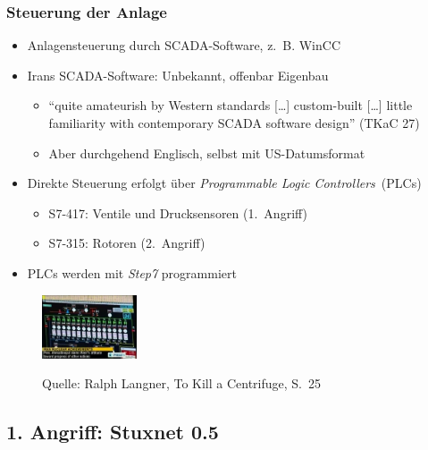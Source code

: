 \documentclass{beamer}
\begin{document}
\begin{frame}
  \frametitle{Steuerung der Anlage}
  \begin{itemize}
    \item Anlagensteuerung durch SCADA-Software, z.~B. WinCC
    \item Irans SCADA-Software: Unbekannt, offenbar Eigenbau
      \begin{itemize}
        \item ``quite amateurish by Western standards […] custom-built […] little familiarity with contemporary SCADA software design'' (TKaC 27)
        \item Aber durchgehend Englisch, selbst mit US-Datumsformat
      \end{itemize}
    \item Direkte Steuerung erfolgt über \emph{Programmable Logic Controllers}~(PLCs)
      \begin{itemize}
        \item S7-417: Ventile und Drucksensoren (1.~Angriff)
        \item S7-315: Rotoren (2.~Angriff)
      \end{itemize}
    \item PLCs werden mit \emph{Step7} programmiert
  \end{itemize}
  \begin{figure}
    \vspace{-0.2\textheight}
    \raggedleft
    \includegraphics[width=0.25\textwidth]{../SCADA.png}
    
    \tiny{Quelle: Ralph Langner, To Kill a Centrifuge, S.~25}
  \end{figure}
\end{frame}

\subsection{1. Angriff: Stuxnet 0.5}
\end{document}
